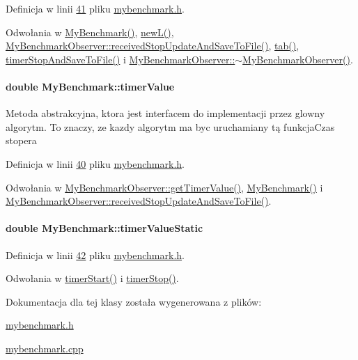 Definicja w linii \hyperlink{mybenchmark_8h_source_l00041}{41} pliku \hyperlink{mybenchmark_8h_source}{mybenchmark.\-h}.



Odwołania w \hyperlink{mybenchmark_8h_source_l00043}{My\-Benchmark()}, \hyperlink{mybenchmark_8cpp_source_l00033}{new\-L()}, \hyperlink{mybenchmark_8h_source_l00086}{My\-Benchmark\-Observer\-::received\-Stop\-Update\-And\-Save\-To\-File()}, \hyperlink{mybenchmark_8cpp_source_l00028}{tab()}, \hyperlink{mybenchmark_8cpp_source_l00022}{timer\-Stop\-And\-Save\-To\-File()} i \hyperlink{mybenchmark_8h_source_l00092}{My\-Benchmark\-Observer\-::$\sim$\-My\-Benchmark\-Observer()}.

\hypertarget{class_my_benchmark_a1cdab837ead670bd438f249ee82c8eff}{
\paragraph[{timer\-Value}]{\setlength{\rightskip}{0pt plus 5cm}double My\-Benchmark\-::timer\-Value}}\label{class_my_benchmark_a1cdab837ead670bd438f249ee82c8eff}
Metoda abstrakcyjna, ktora jest interfacem do implementacji przez glowny algorytm. To znaczy, ze kazdy algorytm ma byc uruchamiany tą funkcja\-Czas stopera 

Definicja w linii \hyperlink{mybenchmark_8h_source_l00040}{40} pliku \hyperlink{mybenchmark_8h_source}{mybenchmark.\-h}.



Odwołania w \hyperlink{mybenchmark_8h_source_l00076}{My\-Benchmark\-Observer\-::get\-Timer\-Value()}, \hyperlink{mybenchmark_8h_source_l00043}{My\-Benchmark()} i \hyperlink{mybenchmark_8h_source_l00086}{My\-Benchmark\-Observer\-::received\-Stop\-Update\-And\-Save\-To\-File()}.

\hypertarget{class_my_benchmark_aeca64d5b265e357ef879bf982dd4bb00}{
\paragraph[{timer\-Value\-Static}]{\setlength{\rightskip}{0pt plus 5cm}double My\-Benchmark\-::timer\-Value\-Static}}\label{class_my_benchmark_aeca64d5b265e357ef879bf982dd4bb00}


Definicja w linii \hyperlink{mybenchmark_8h_source_l00042}{42} pliku \hyperlink{mybenchmark_8h_source}{mybenchmark.\-h}.



Odwołania w \hyperlink{mybenchmark_8cpp_source_l00012}{timer\-Start()} i \hyperlink{mybenchmark_8cpp_source_l00017}{timer\-Stop()}.



Dokumentacja dla tej klasy została wygenerowana z plików\-:\begin{DoxyCompactItemize}
\item 
\hyperlink{mybenchmark_8h}{mybenchmark.\-h}\item 
\hyperlink{mybenchmark_8cpp}{mybenchmark.\-cpp}\end{DoxyCompactItemize}
